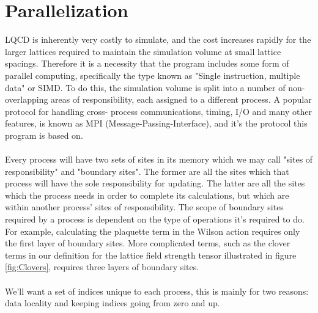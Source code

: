 \documentclass[a4paper,10pt]{book}
\begin{document}
\section{Parallelization}\label{sec:parallelization}
LQCD is inherently very costly to simulate, and the cost increases rapidly for the larger lattices required to maintain the simulation volume at small lattice spacings. Therefore it is a necessity that the program includes some form of parallel computing, specifically the type known as "Single instruction, multiple data" or SIMD. To do this, the simulation volume is split into a number of non-overlapping areas of responsibility, each assigned to a different process. A popular protocol for handling cross- process communications, timing, I/O and many other features, is known as MPI (Message-Passing-Interface), and it's the protocol this program is based on.\\\\Every process will have two sets of sites in its memory which we may call "sites of responsibility" and "boundary sites". The former are all the sites which that process will have the sole responsibility for updating. The latter are all the sites which the process needs in order to complete its calculations, but which are within another process' sites of responsibility. The scope of boundary sites required by a process is dependent on the type of operations it's required to do. For example, calculating the plaquette term in the Wilson action requires only the first layer of boundary sites. More complicated terms, such as the clover terms in our definition for the lattice field strength tensor  illustrated in figure \ref{fig:Clovers}, requires three layers of boundary sites.\\\\We'll want a set of indices unique to each process, this is mainly for two reasons: data locality and keeping indices going from zero and up.
\end{document}
